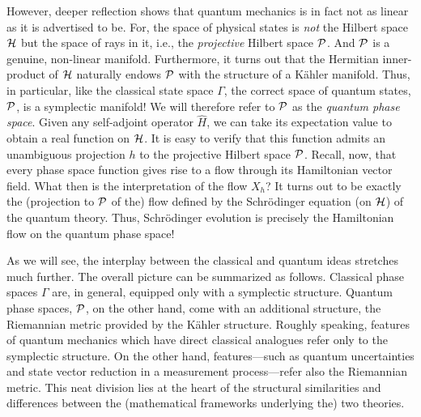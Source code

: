 However, deeper reflection shows that quantum mechanics is in fact not
as linear as it is advertised to be. For, the space of physical states
is {\it not} the Hilbert space $\H$ but the space of rays in it, i.e.,
the {\it projective} Hilbert space $\P$. And $\P$ is a genuine,
non-linear manifold. Furthermore, it turns out that the Hermitian
inner-product of $\H$ naturally endows $\P$ with the structure of a
K\"ahler manifold. Thus, in particular, like the classical state space
$\Gamma$, the correct space of quantum states, $\P$, is a symplectic
manifold! We will therefore refer to $\P$ as the {\it quantum phase
space}. Given any self-adjoint operator $\hat{H}$, we can take its
expectation value to obtain a real function on $\H$. It is easy to
verify that this function admits an unambiguous projection $h$ to the
projective Hilbert space $\P$. Recall, now, that every phase space
function gives rise to a flow through its Hamiltonian vector field.
What then is the interpretation of the flow $X_h$? It turns out
\cite{kibble} to be exactly the (projection to $\P$ of the) flow
defined by the Schr\"odinger equation (on $\H$) of the quantum theory.
Thus, Schr\"odinger evolution is precisely the Hamiltonian flow on the
quantum phase space!

As we will see, the interplay between the classical and quantum ideas
stretches much further. The overall picture can be summarized as
follows. Classical phase spaces $\Gamma$ are, in general, equipped
only with a symplectic structure.  Quantum phase spaces, $\P$, on the
other hand, come with an additional structure, the Riemannian metric
provided by the K\"ahler structure.  Roughly speaking, features of
quantum mechanics which have direct classical analogues refer only to
the symplectic structure.  On the other hand, features---such as
quantum uncertainties and state vector reduction in a measurement
process---refer also the Riemannian metric. This neat division lies at
the heart of the structural similarities and differences between the
(mathematical frameworks underlying the) two theories.

